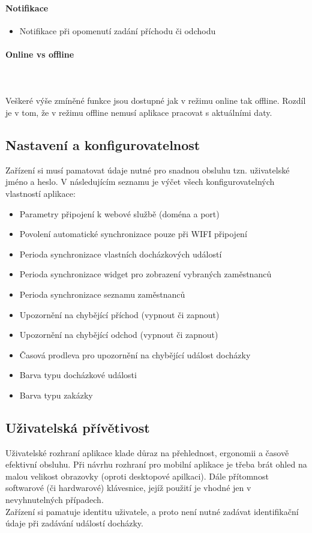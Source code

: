 \documentclass{diplomka}
\begin{document}
\paragraph{Notifikace}
\begin{itemize}[noitemsep,nolistsep]
\item Notifikace při opomenutí zadání příchodu či odchodu
\end{itemize}

\paragraph{Online vs offline}\mbox{}\\ \\ \indent
Veškeré výše zmíněné funkce jsou dostupné jak v režimu online tak offline. Rozdíl je v tom, že v režimu offline nemusí aplikace pracovat s aktuálními daty.

\subsection{Nastavení a konfigurovatelnost}
Zařízení si musí pamatovat údaje nutné pro snadnou obsluhu tzn. uživatelské jméno a heslo. V následujícím seznamu je výčet všech konfigurovatelných vlastností aplikace:

\begin{itemize}[noitemsep,nolistsep]
\item Parametry připojení k webové službě (doména a port)
\item Povolení automatické synchronizace pouze při WIFI připojení
\item Perioda synchronizace vlastních docházkových událostí
\item Perioda synchronizace widget pro zobrazení vybraných zaměstnanců
\item Perioda synchronizace seznamu zaměstnanců
\item Upozornění na chybějící příchod (vypnout či zapnout)
\item Upozornění na chybějící odchod (vypnout či zapnout)
\item Časová prodleva pro upozornění na chybějící událost docházky
\item Barva typu docházkové události
\item Barva typu zakázky
\end{itemize}

\subsection{Uživatelská přívětivost}
Uživatelské rozhraní aplikace klade důraz na přehlednost, ergonomii a časově efektivní obsluhu. Při návrhu rozhraní pro mobilní aplikace je třeba brát ohled na malou velikost obrazovky (oproti desktopové apilkaci). Dále přítomnost softwarové (či hardwarové) klávesnice, jejíž použití je vhodné jen v nevyhnutelných případech.  \\ \indent Zařízení si pamatuje identitu uživatele, a proto není nutné zadávat identifikační údaje při zadávání událostí docházky.
\end{document}
